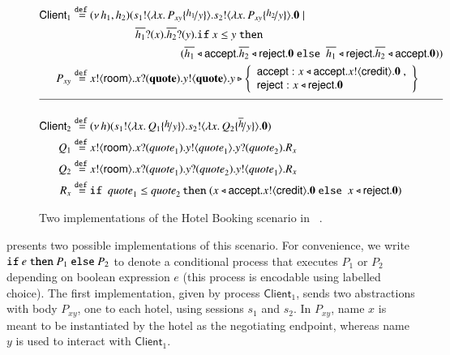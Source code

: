 \documentclass[preprint,11pt]{elsarticle}
\newcommand{\rtype}{\mathsf{room}}
\newcommand{\Quotev}{\mathit{quote}}
\newcommand{\accept}{\mathsf{accept}}
\newcommand{\reject}{\mathsf{reject}}
\newcommand{\creditc}{\mathsf{credit}}
\newcommand{\Client}{\mathsf{Client}}
\begin{document}
{%
\begin{figure}[t!]
	\begin{align*}%
		 \Client_1    \defeq  &  \newsp{h_1, h_2}{\bout{s_1}{\abs{x}{P_{xy} \subst{h_1}{y}}} \bout{s_2}{\abs{x}{P_{xy} \subst{h_2}{y}}} \inact \Par  \\
		 & 
		\qquad \qquad\binp{\dual{h_1}}{x} \binp{\dual{h_2}}{y}  \If x \leq y\   \Then
		\\
		 & \qquad\qquad \qquad \qquad (\bsel{\dual{h_1}}{\accept} \bsel{\dual{h_2}}{\reject} \inact \ \Else \ \bsel{\dual{h_1}}{\reject} \bsel{\dual{h_2}}{\accept} \inact )
		}
		\\
				 P_{xy}     \defeq &    \bout{x}{\rtype} \binp{x}{\Quotev} \bout{y}{\Quotev}
		y \triangleright \left\{
				\begin{array}{l}
					\accept: \bsel{x}{\accept} \bout{x}{\creditc} \inact~,\\
					\reject: \bsel{x}{\reject} \inact
				\end{array}
				\right\}
				\\[2mm]
				\hline
				\\
						\Client_2 \defeq& \newsp{h}{\bout{s_1}{\abs{x}{Q_1 \subst{h}{y}}} \bout{s_2}{\abs{x}{Q_2 \subst{\dual{h}}{y}}} \inact}
\\
		Q_1 \defeq&	\bout{x}{\rtype} \binp{x}{\Quotev_1} \bout{y}{\Quotev_1} \binp{y}{\Quotev_2} R_x \\
		Q_2 \defeq&	\bout{x}{\rtype} \binp{x}{\Quotev_1} \binp{y}{\Quotev_2} \bout{y}{\Quotev_1} R_x \\
			    R_x  \defeq & \If\ \Quotev_1 \leq \Quotev_2 \, \Then  (\bsel{x}{\accept} \bout{x}{\creditc} \inact \  \Else \ \bsel{x}{\reject} \inact)
	\end{align*}
	\caption{Two implementations of the Hotel Booking scenario in \HOp~\cite{KouzapasPY17}.}\label{f:hotel}
	\end{figure}
%
 presents
two possible \HOp implementations of this scenario.
For convenience, we write 
$\mathtt{if}\  e\ \mathtt{then}\  P_1\ \mathtt{else}\   P_2$
to denote a conditional process that executes $P_1$ or $P_2$ depending on boolean expression $e$ (this process is encodable using labelled choice).
The {first implementation}, given by 
process $\Client_1$, sends two abstractions with body $P_{xy}$, one to each hotel, 
		using sessions $s_1$ and $s_2$.
		In $P_{xy}$, %
			name $x$ is meant to be instantiated by the hotel as the negotiating
		endpoint, whereas name $y$ is used to interact with $\Client_1$.	
}
\end{document}
